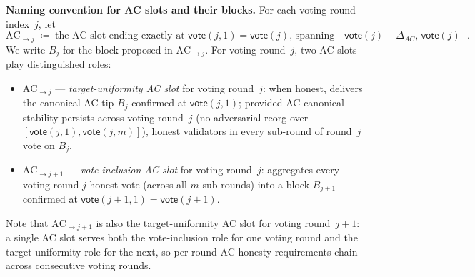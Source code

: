 \ifx\litemode\undefined\documentclass{article}\fi
\newcommand{\vote}{\ensuremath{\mathsf{vote}}}
\renewcommand{\paragraph}[1]{\vspace{7pt}\noindent\textbf{#1}}
\theoremstyle{plain}
\theoremstyle{definition}
\theoremstyle{remark}
\begin{document}
\paragraph{Naming convention for AC slots and their blocks.}
For each voting round index~$j$, let
\[
  \mathrm{AC}_{\to j} \;\coloneqq\; \text{the AC slot ending exactly at $\vote(j, 1) = \vote(j)$, spanning $[\vote(j) - \Delta_{\mathit{AC}},\, \vote(j)]$.}
\]
We write $B_j$ for the block proposed in $\mathrm{AC}_{\to j}$. For voting round~$j$, two AC slots play distinguished roles:
\begin{itemize}
  \item $\mathrm{AC}_{\to j}$ --- \emph{target-uniformity AC slot} for voting round~$j$: when honest, delivers the canonical AC tip $B_j$ confirmed at $\vote(j, 1)$; provided AC canonical stability persists across voting round~$j$ (no adversarial reorg over $[\vote(j, 1), \vote(j, m)]$), honest validators in every sub-round of round~$j$ vote on $B_j$.
  \item $\mathrm{AC}_{\to j+1}$ --- \emph{vote-inclusion AC slot} for voting round~$j$: aggregates every voting-round-$j$ honest vote (across all $m$ sub-rounds) into a block $B_{j+1}$ confirmed at $\vote(j{+}1, 1) = \vote(j{+}1)$.
\end{itemize}
Note that $\mathrm{AC}_{\to j+1}$ is also the target-uniformity AC slot for voting round~$j+1$: a single AC slot serves both the vote-inclusion role for one voting round and the target-uniformity role for the next, so per-round AC honesty requirements chain across consecutive voting rounds.
\end{document}
